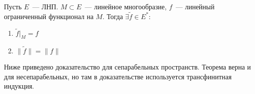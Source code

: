 \begin{theorem}\label{Han-Banah}
Пусть $E$~--- ЛНП. $M \subset E$~--- линейное многообразие, $f$~--- линейный ограниченный функционал на $M$. Тогда $\exists \widetilde{f} \in E^*$:
\begin{enumerate}
    \item  $ \widetilde{f} |_{M} = f$
    \item \(\| \widetilde{f} \| = \|f\|\)
\end{enumerate}
\end{theorem}

\begin{note} Ниже приведено доказательство для сепарабельных пространств. Теорема верна и для несепарабельных, но там в доказательстве используется трансфинитная индукция.
\end{note}


